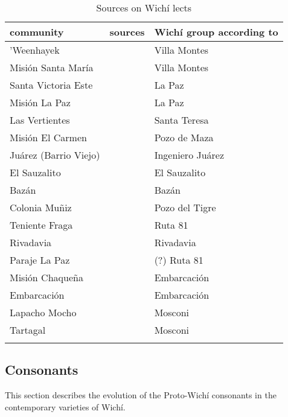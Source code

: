 \begin{table}[t]
\caption{Sources on Wichí lects}
\label{wi-lects}
 \begin{tabularx}{\textwidth}{lQp{2.2cm}}
  \lsptoprule
            community & sources & Wichí group according to \citet{JB09}\\
            \midrule
            ’Weenhayek & \citet{KC94,KC16} & Villa Montes\\
            Misión Santa María & \citet{SS07,AFG-SS-09} & Villa Montes\\
            Santa Victoria Este & \citet{AFG-SS-09} & La Paz\\
            Misión La Paz & \citet{MA08} & La Paz\\
            Las Vertientes & \citet{AFG-SS-09} & Santa Teresa\\
            Misión El Carmen & \citet{MC09} & Pozo de Maza\\
            Juárez (Barrio Viejo) & \citet{LCB-MBC09,LCB15,VN14} & Ingeniero Juárez\\
            El Sauzalito & \citet{MC09,VN14} & El Sauzalito\\
            Bazán & \citet{JB09,MC09,VN14} & Bazán\\
            Colonia Muñiz & \citet{MC09,VN14} & Pozo del Tigre\\
            Teniente Fraga & \citet{MC09} & Ruta 81\\
            Rivadavia & \citet{JT09-th} & Rivadavia\\
            Paraje La Paz & \citet{AFG067,AFG-SS-09} & (?) Ruta 81\\
            Misión Chaqueña & \citet{MG-MELO15} & Embarcación\\
            Embarcación & \citet{VU74} & Embarcación\\
            Lapacho Mocho & \citet{AFG-SS-09} & Mosconi\\
            Tartagal & \citet{VU74,LCB15} & Mosconi\\
    \lspbottomrule
 \end{tabularx}
\end{table}

\subsection{Consonants}

This section describes the evolution of the Proto-Wichí consonants in the contemporary varieties of Wichí.

